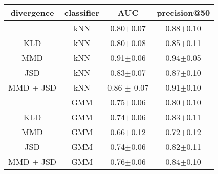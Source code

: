 \begin{tabular}{c c c c}
	\toprule
	divergence & classifier & AUC & precision@50  \\
	\midrule
	-- & kNN & 0.80$\pm$0.07 &  \cellcolor{gray!15} 0.88$\pm$0.10 \\
	KLD & kNN & 0.80$\pm$0.08 & 0.85$\pm$0.11 \\
	MMD & kNN &  \cellcolor{gray!45} 0.91$\pm$0.06 &  \cellcolor{gray!45} 0.94$\pm$0.05\\
    JSD & kNN &  \cellcolor{gray!15} 0.83$\pm$0.07 & 0.87$\pm$0.10\\
    MMD + JSD & kNN &  \cellcolor{gray!30} 0.86 $\pm$ 0.07 &  \cellcolor{gray!30} 0.91$\pm$0.10 \\
    -- & GMM & 0.75$\pm$0.06 & 0.80$\pm$0.10\\
	KLD & GMM & 0.74$\pm$0.06 & 0.83$\pm$0.11\\
	MMD & GMM & 0.66$\pm$0.12 & 0.72$\pm$0.12\\
    JSD & GMM & 0.74$\pm$0.06 & 0.82$\pm$0.11\\
    MMD + JSD & GMM & 0.76$\pm$0.06 & 0.84$\pm$0.10 \\
    \bottomrule
\end{tabular}